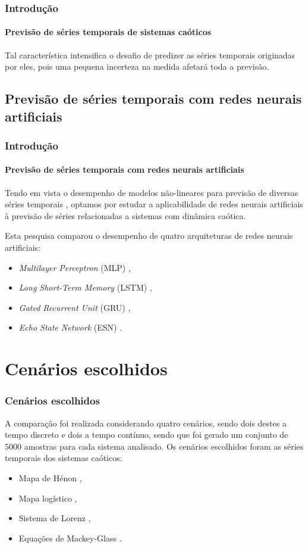 \documentclass[aspectratio=169]{beamer}
\begin{document}
\begin{frame}
    \frametitle{Introdução}
    \framesubtitle{Previsão de séries temporais de sistemas caóticos}
    \justifying Tal característica intensifica o desafio de predizer as séries temporais originadas por eles, pois uma pequena incerteza na medida afetará toda a previsão. 

\end{frame}

\subsection{Previsão de séries temporais com redes neurais artificiais}

\begin{frame}
    \frametitle{Introdução}
    \framesubtitle{Previsão de séries temporais com redes neurais artificiais}
    \justifying Tendo em vista o desempenho de modelos não-lineares para previsão de diversas séries temporais \cite{connor1994recurrent}, optamos por estudar a aplicabilidade de redes neurais artificiais à previsão de séries relacionadas a sistemas com dinâmica caótica. 
    
    Esta pesquisa comparou o desempenho de quatro arquiteturas de redes neurais artificiais:
    
    \begin{itemize}[<+-| alert@+>]
	\item \textit{Multilayer Perceptron} (MLP) \cite{rosenblatt1958perceptron},
	\item \textit{Long Short-Term Memory} (LSTM) \cite{connor1994recurrent},
	\item \textit{Gated Recurrent Unit} (GRU) \cite{cho2014learning},
	\item \textit{Echo State Network} (ESN) \cite{jaeger2007echo}.
    \end{itemize} 
\end{frame}

\section{Cenários escolhidos}

\begin{frame}
    \frametitle{Cenários escolhidos}
    \justifying A comparação foi realizada considerando quatro cenários, sendo dois destes a tempo discreto e dois a tempo contínuo, sendo que foi gerado um conjunto de $5000$ amostras para cada sistema analisado. Os cenários escolhidos foram as séries temporais dos sistemas caóticos:

    \begin{itemize}[<+-| alert@+>]    
    \item Mapa de Hénon \cite{henon1976two},
    \item Mapa logístico \cite{may1976simple},
    \item Sistema de Lorenz \cite{lorenz1963deterministic},
    \item Equações de Mackey-Glass \cite{mackey1977oscillation}.
    \end{itemize}
\end{frame}
\end{document}
